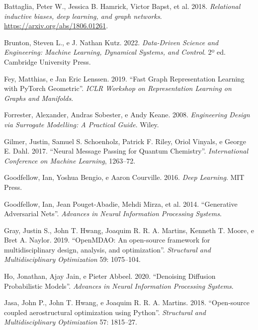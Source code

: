 \documentclass[
  brazilian,
  a4paper,
  DIV=11,
  numbers=noendperiod]{scrreprt}
\newlength{\cslhangindent}
\newenvironment{CSLReferences}[2] %
 {\begin{list}{}{%
  \setlength{\itemindent}{0pt}
  \setlength{\leftmargin}{0pt}
  \setlength{\parsep}{0pt}
  \ifodd #1
   \setlength{\leftmargin}{\cslhangindent}
   \setlength{\itemindent}{-1\cslhangindent}
  \fi
  \setlength{\itemsep}{#2\baselineskip}}}
 {\end{list}}
\begin{document}
\protect{}\label{refs}
\begin{CSLReferences}{1}{1}
Battaglia, Peter W., Jessica B. Hamrick, Victor Bapst, et al. 2018.
\emph{Relational inductive biases, deep learning, and graph networks}.
\url{https://arxiv.org/abs/1806.01261}.

Brunton, Steven L., e J. Nathan Kutz. 2022. \emph{Data-Driven Science
and Engineering: Machine Learning, Dynamical Systems, and Control}. 2º
ed. Cambridge University Press.

Fey, Matthias, e Jan Eric Lenssen. 2019. {``Fast Graph Representation
Learning with PyTorch Geometric''}. \emph{ICLR Workshop on
Representation Learning on Graphs and Manifolds}.

Forrester, Alexander, Andras Sobester, e Andy Keane. 2008.
\emph{Engineering Design via Surrogate Modelling: A Practical Guide}.
Wiley.

Gilmer, Justin, Samuel S. Schoenholz, Patrick F. Riley, Oriol Vinyals, e
George E. Dahl. 2017. {``Neural Message Passing for Quantum
Chemistry''}. \emph{International Conference on Machine Learning},
1263--72.

Goodfellow, Ian, Yoshua Bengio, e Aaron Courville. 2016. \emph{Deep
Learning}. MIT Press.

Goodfellow, Ian, Jean Pouget-Abadie, Mehdi Mirza, et al. 2014.
{``Generative Adversarial Nets''}. \emph{Advances in Neural Information
Processing Systems}.

Gray, Justin S., John T. Hwang, Joaquim R. R. A. Martins, Kenneth T.
Moore, e Bret A. Naylor. 2019. {``OpenMDAO: An open-source framework for
multidisciplinary design, analysis, and optimization''}.
\emph{Structural and Multidisciplinary Optimization} 59: 1075--104.

Ho, Jonathan, Ajay Jain, e Pieter Abbeel. 2020. {``Denoising Diffusion
Probabilistic Models''}. \emph{Advances in Neural Information Processing
Systems}.

Jasa, John P., John T. Hwang, e Joaquim R. R. A. Martins. 2018.
{``Open-source coupled aerostructural optimization using Python''}.
\emph{Structural and Multidisciplinary Optimization} 57: 1815--27.


\end{CSLReferences}
\end{document}
